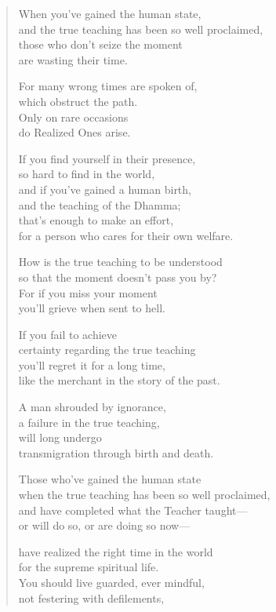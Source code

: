 \documentclass[12pt,openany]{book}%
\begin{document}
\begin{verse}%
When you’ve gained the human state, \\
and the true teaching has been so well proclaimed, \\
those who don’t seize the moment \\
are wasting their time. 

For many wrong times are spoken of, \\
which obstruct the path. \\
Only on rare occasions \\
do Realized Ones arise. 

If you find yourself in their presence, \\
so hard to find in the world, \\
and if you’ve gained a human birth, \\
and the teaching of the Dhamma; \\
that’s enough to make an effort, \\
for a person who cares for their own welfare. 

How is the true teaching to be understood \\
so that the moment doesn’t pass you by? \\
For if you miss your moment \\
you’ll grieve when sent to hell. 

If you fail to achieve \\
certainty regarding the true teaching \\
you’ll regret it for a long time, \\
like the merchant in the story of the past. 

A man shrouded by ignorance, \\
a failure in the true teaching, \\
will long undergo \\
transmigration through birth and death. 

Those who’ve gained the human state \\
when the true teaching has been so well proclaimed, \\
and have completed what the Teacher taught—\\
or will do so, or are doing so now—

have realized the right time in the world \\
for the supreme spiritual life. \\
You should live guarded, ever mindful, \\
not festering with defilements, 


\end{verse}
\end{document}
